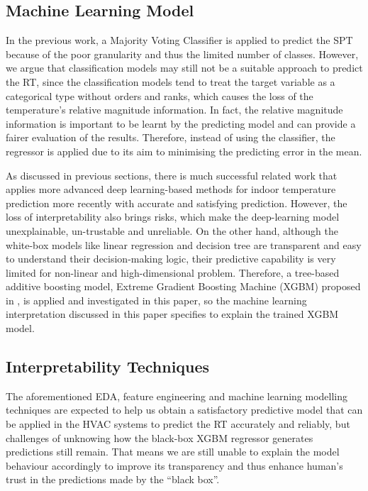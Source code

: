 \documentclass[11pt]{article}
\begin{document}
    \subsection{Machine Learning Model}

    In the previous work, a Majority Voting Classifier is applied to predict the SPT because of the poor granularity and thus the limited number of classes. However, we argue that classification models may still not be a suitable approach to predict the RT, since  the classification models tend to treat the target variable as a categorical type without orders and ranks, which causes the loss of the temperature’s relative magnitude information. In fact, the relative magnitude information is important to be learnt by the predicting model and can provide a fairer evaluation of the results. Therefore, instead of using the classifier, the regressor is applied due to its aim to minimising the predicting error in the mean.
    
    As discussed in previous sections, there is much successful related work that applies more advanced deep learning-based methods for indoor temperature prediction more recently with accurate and satisfying prediction. However, the loss of interpretability also brings risks, which make the deep-learning model unexplainable, un-trustable and unreliable. On the other hand, although the white-box models like linear regression and decision tree are transparent and easy to understand their decision-making logic, their predictive capability is very limited for non-linear and high-dimensional problem. Therefore, a tree-based additive boosting model, Extreme Gradient Boosting Machine (XGBM) proposed in \citep{chen2015xgboost}, is applied and investigated in this paper, so the machine learning interpretation discussed in this paper specifies to explain the trained XGBM model.
    
    \subsection{Interpretability Techniques}
    
    The aforementioned EDA, feature engineering and machine learning modelling techniques are expected to help us obtain a satisfactory predictive model that can be applied in the HVAC systems to predict the RT accurately and reliably, but challenges of unknowing how the black-box XGBM regressor generates predictions still remain. That means we are still unable to explain the model behaviour accordingly to improve its transparency and thus enhance human’s trust in the predictions made by the “black box”.
    
\end{document}
